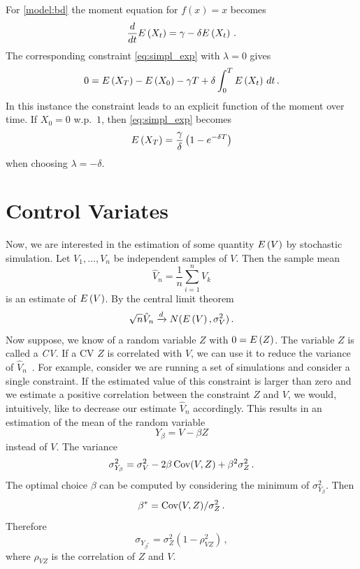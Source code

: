 \begin{example}
For \autoref{model:bd} the moment equation for $f(x)=x$ becomes
	\[
		\frac{d}{dt}{E}\left(X_t\right)=\gamma - \delta{E}\left(X_t\right)\,.
	\]
The corresponding constraint \eqref{eq:simpl_exp} with $\lambda=0$ gives
	\[
		0={E}\left(X_T\right) - {E}\left(X_0\right) - \gamma T + \delta \int_0^{T} {E}\left(X_t\right)\,dt\,.
	\]
In this instance the constraint  leads to an explicit function of
the moment over time. If  $X_0=0$ w.p.\ $1$, then \eqref{eq:simpl_exp} becomes
\begin{equation}\label{eq:bd_constraint}
{E}\left(X_T\right) = \frac{\gamma}{\delta} \left(1 - e^{-\delta T}\right)
\end{equation}
when choosing $\lambda=-\delta$.
\end{example}

\section{Control Variates}\label{sec:cv:var_red}
Now, we are interested in the estimation of some quantity ${E}\left(V\right)$
by stochastic simulation.
Let $V_1,\dots,V_n$ be independent samples of $V$.
Then the sample mean 
\[
	\hat{V}_n =\frac{1}{n}\sum_{i=1}^n V_k
\]
is an estimate of ${E}\left(V\right)$.  By the central limit theorem
\[
\sqrt{n}\hat{V}_n\xrightarrow{d}N({E}\left(V\right),\sigma_V^2)\,.
\]
Now suppose, we know of a random variable $Z$ with $0={E}\left(Z\right)$.
The variable $Z$ is called a \emph{\acf{CV}}.
If a \acl{CV} $Z$ is correlated with $V$, we can
use it to
reduce the variance of $\hat{V}_n$~\cite{glasserman2005large,nelson1990control,szechtman2003control,wilson1984variance}.
For example, consider we are running a set of simulations and consider a single
constraint.
If the estimated value of this constraint is larger than zero and we estimate a positive correlation
between the constraint $Z$ and $V$, we would, intuitively, like to {decrease} our
estimate $\hat{V}_n$ accordingly.
This results in an estimation of the mean of the random variable
\[
	Y_{\beta}= V-\beta Z
\]
instead of $V$.
The variance%
\[
	\sigma_{Y_{\beta}}^2 = \sigma_V^2-2\beta \operatorname*{Cov}(V, Z) + \beta^2\sigma_Z^2\,.
\]
The optimal choice $\beta$ can be computed by  considering the minimum of $\sigma_{Y_\beta}^2$. Then
\[
	\beta^{*}={\operatorname*{Cov}(V, Z)}/{\sigma_Z^2}\,.
\]
Therefore 
\[
	\sigma_{Y_{\beta^{*}}}=\sigma_Z^2(1 - \rho_{VZ}^2)\,,
\]
where $\rho_{VZ}$ is the correlation of $Z$ and $V$.

